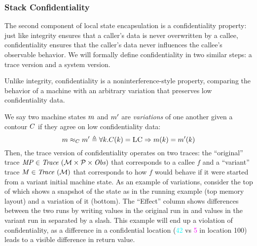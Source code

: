 \documentclass[acmsmall,review,anonymous]{acmart}\settopmatter{printfolios=true,printccs=false,printacmref=false}
\begin{document}
%

\subsubsection{Stack Confidentiality}

The second component of local state encapsulation is a confidentiality
property: just like integrity ensures that a caller's data is never
overwritten by a callee, confidentiality ensures that the caller's data never
influences the callee's observable behavior. We will formally define
confidentiality in two similar steps: a trace version and a system
version.

Unlike integrity, confidentiality is a noninterference-style property,
comparing the behavior of a machine with an arbitrary variation that
preserves low confidentiality data.

We say two machine states \(m\) and \(m'\) are {\em variations}
of one another given a contour \(C\) if they agree on low
confidentiality data:
%
\[
m \approx_C m' \triangleq \forall k .
C(k) = \textsc{LC} \Rightarrow m(k) =
m'(k)
\]
%
Then, the trace version of confidentiality operates on two traces: the
``original'' trace $\mathit{MP} \in \mathit{Trace}~({\mathcal M} \times \mathcal{P} \times \mathit{Obs})$ that corresponds to a callee $f$
and a ``variant'' trace $M \in \mathit{Trace}~({\mathcal M})$ that corresponds to how $f$
would behave if it were started from a variant initial machine state.
%
As an example of variations, consider the top of 
which shows a snapshot of the state as in the running example (top
memory layout) and a variation of it (bottom).
%
The ``Effect'' column shows differences between the two runs by writing values
in the original run in {\high} and values in the variant run in {\varied}
separated by a slash.
%
This example will end up a violation of confidentiality, as a
difference in a confidential location (\textcolor{cyan}{42} vs
\textcolor{magenta}{5} in location 100) leads to a visible
difference in return value.
\end{document}
